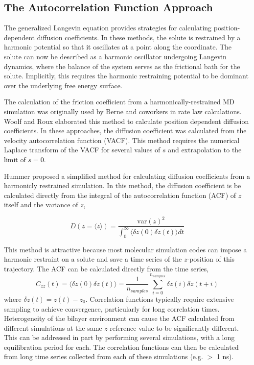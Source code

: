 \subsection{The Autocorrelation Function Approach}
The generalized Langevin equation provides strategies for calculating position-dependent diffusion coefficients.  In these methods, the solute is restrained by a harmonic potential so that it oscillates at a point along the coordinate. The solute can now be described as a harmonic oscillator undergoing Langevin dynamics, where the balance of the system serves as the frictional bath for the solute. Implicitly, this requires the harmonic restraining potential to be dominant over the underlying free energy surface. 

The calculation of the friction coefficient from a harmonically-restrained MD simulation was originally used by Berne and coworkers in rate law calculations.\cite{BerneRateTheory1} Woolf and Roux elaborated this method to calculate position dependent diffusion coefficients.\cite{WoolfRouxDiffusion1994} In these approaches, the diffusion coefficient was calculated from the velocity autocorrelation function (VACF). This method requires the numerical Laplace transform of the VACF for several values of $s$ and extrapolation to the limit of $s=0$.

Hummer proposed a simplified method for calculating diffusion coefficients from a harmonicly restrained simulation.\cite{Hummer2005} In this method, the diffusion coefficient is be calculated directly from the integral of the autocorrelation function (ACF) of $z$ itself and the variance of $z$,

\begin{equation}
D(z= \langle z \rangle ) = \frac{\textrm{var}(z)^2}{\int_0^\infty \langle \delta z(0) \delta z(t) \rangle dt}
\label{eq:diff_hummer}
\end{equation}

This method is attractive because most molecular simulation codes can impose a harmonic restraint on a solute and save a time series of the $z$-position of this trajectory. The ACF can be calculated directly from the time series,\cite{Allen-Tildesley}
\begin{equation}
C_{zz}(t) =  \langle \delta z(0) \delta z(t) \rangle = \frac{1}{n_{samples}}\sum\limits_{i=0}^{n_{samples}} \delta z(i) \delta z(t+i)
\label{eq:correlation_sum}
\end{equation}
where $\delta z(t) = z(t)-z_0$. Correlation functions typically require extensive sampling to achieve convergence, particularly for long correlation times. Heterogeneity of the bilayer environment can cause the ACF calculated from different simulations at the same $z$-reference value to be significantly different. This can be addressed in part by performing several simulations, with a long equilibration period for each. The correlation functions can then be calculated from long time series collected from each of these simulations (e.g. $>$ 1 ns).

